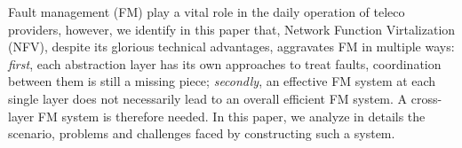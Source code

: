 Fault management (FM) play a vital role in the daily operation of teleco providers, however, we identify in
this paper that, Network Function Virtalization (NFV), despite its glorious technical advantages, aggravates
FM in multiple ways: \textit{first}, each abstraction layer has its own approaches to treat faults,
coordination between them is still a missing piece; \textit{secondly}, an effective FM system at each single
layer does not necessarily lead to an overall efficient FM system. A cross-layer FM system is therefore
needed. In this paper, we analyze in details the scenario, problems and challenges faced by constructing such
a system.        
